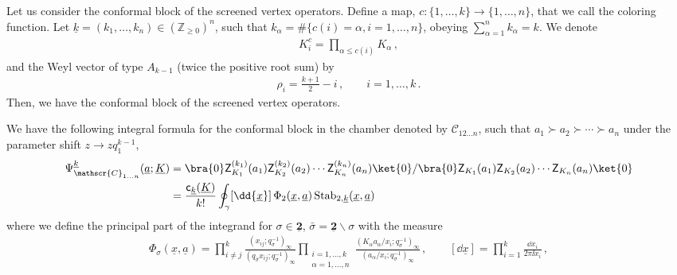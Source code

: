 Let us consider the conformal block of the screened vertex operators.
Define a map, $c: \{1,\ldots,k\} \to \{1,\ldots,n\}$, that we call the coloring function.
    Let $\underline{k} = (k_1,\ldots,k_n) \in (\mathbb{Z}_{\ge 0})^n$, such that $k_\alpha = \#\{ c(i) = \alpha , i = 1,\ldots, n \}$, obeying $\sum_{\alpha=1}^n k_\alpha = k$.
We denote
\begin{align}
    K_i^c = \prod_{\alpha \le c(i)} K_\alpha \, ,
\end{align}
and the Weyl vector of type $A_{k-1}$ (twice the positive root sum) by
\begin{align}
        \rho_i = \frac{k+1}{2} - i \, , \qquad i = 1,\ldots, k \, .
\end{align}
Then, we have the conformal block of the screened vertex operators.

\begin{proposition}\label{prop:conf_block_A1}
    We have the following integral formula for the conformal block in the chamber denoted by $\mathscr{C}_{12\ldots n}$, such that $a_1 \succ a_2 \succ \cdots \succ a_n$ under the parameter shift $z \to z q_1^{k-1}$,
    \begin{align}
        \Psi_{\mathscr{C}_{1\ldots n}}^{\underline{k}}(\underline{a};\underline{K}) & = \bra{0} \mathsf{Z}^{(k_1)}_{K_1}(a_1) \mathsf{Z}^{(k_2)}_{K_2}(a_2) \cdots \mathsf{Z}^{(k_n)}_{K_n}(a_n) \ket{0} / \bra{0} \mathsf{Z}_{K_1}(a_1) \mathsf{Z}_{K_2}(a_2) \cdots \mathsf{Z}_{K_n}(a_n) \ket{0}
        \nonumber \\ 
        & = \frac{\mathsf{c}_{\underline{k}}(\underline{K})}{k!} \oint_\gamma [\dd{\underline{x}}] \, \Phi_{2}(\underline{x},\underline{a})         \operatorname{Stab}_{2,\underline{k}}        (\underline{x},\underline{a})
    \end{align}
    where we define the principal part of the integrand for $\sigma \in \underline{\mathbf{2}}$, $\bar{\sigma} = \underline{\mathbf{2}} \backslash \sigma$ with the measure
    \begin{align}
        \Phi_{\sigma}(\underline{x},\underline{a}) = \prod_{i \neq j}^k \frac{(x_{ij};q_\sigma^{-1})_\infty}{(q_{\bar{\sigma}} x_{ij};q_\sigma^{-1})_\infty} \prod_{\substack{i=1,\ldots,k \\ \alpha=1,\ldots,n}} \frac{(K_\alpha a_\alpha/x_i;q_\sigma^{-1})_\infty}{( a_\alpha/x_i;q_\sigma^{-1})_\infty} 
        \, , \qquad 
        [\dd{\underline{x}}] = \prod_{i=1}^k \frac{\dd{x}_i}{2 \pi \ii x_i}
        \, ,
        \label{eq:principal_A1}
    \end{align}

\end{proposition}

